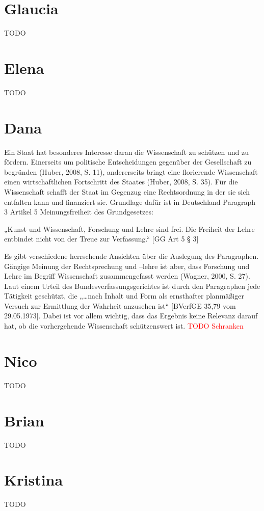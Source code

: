 \documentclass{pmwk}
\begin{document}
\Abgabeblatt{}{}{}{}




\section*{Glaucia}
TODO
\section*{Elena}
TODO
\section*{Dana}
Ein Staat hat besonderes Interesse daran die Wissenschaft zu schützen und zu fördern. Einerseits um politische Entscheidungen gegenüber der Gesellschaft zu begründen (Huber, 2008, S. 11), andererseits bringt eine florierende Wissenschaft einen wirtschaftlichen Fortschritt des Staates (Huber, 2008, S. 35). Für die Wissenschaft schafft der Staat im Gegenzug eine Rechtsordnung in der sie sich entfalten kann und finanziert sie. Grundlage dafür ist in Deutschland Paragraph 3 Artikel 5 Meinungsfreiheit des Grundgesetzes:\par
„Kunst und Wissenschaft, Forschung und Lehre sind frei. Die Freiheit der Lehre entbindet nicht von der Treue zur Verfassung.“ [GG Art 5 § 3]\par
Es gibt verschiedene herrschende Ansichten über die Auslegung des Paragraphen. Gängige Meinung der Rechtsprechung und –lehre ist aber, dass Forschung und Lehre im Begriff Wissenschaft zusammengefasst werden (Wagner, 2000, S. 27). Laut einem Urteil des Bundesverfassungsgerichtes ist durch den Paragraphen jede Tätigkeit geschützt, die „…nach Inhalt und Form als ernsthafter planmäßiger Versuch zur Ermittlung der Wahrheit anzusehen ist“ [BVerfGE 35,79 vom 29.05.1973]. Dabei ist vor allem wichtig, dass das Ergebnis keine Relevanz darauf hat, ob die vorhergehende Wissenschaft schützenswert ist. \textcolor{red}{TODO Schranken}

\section*{Nico}
TODO
\section*{Brian}
TODO
\section*{Kristina}
TODO
\end{document}
